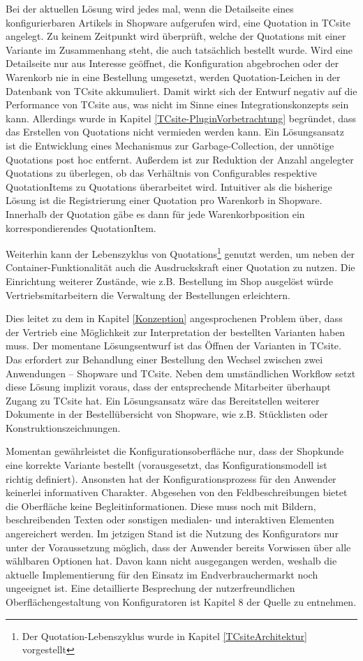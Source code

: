 \documentclass[11pt, a4paper, titlepage, listof=totoc, bibliography=totoc, index=totoc, twoside, openright, headings=normal]{scrreprt}
\begin{document}
Bei der aktuellen Lösung wird jedes mal, wenn die Detailseite eines konfigurierbaren Artikels in Shopware aufgerufen wird, eine Quotation in TCsite angelegt. Zu keinem Zeitpunkt wird überprüft, welche der Quotations mit einer Variante im Zusammenhang steht, die auch tatsächlich bestellt wurde. Wird eine Detailseite nur aus Interesse geöffnet, die Konfiguration abgebrochen oder der Warenkorb nie in eine Bestellung umgesetzt, werden \glqq Quotation-Leichen\grqq{} in der Datenbank von TCsite akkumuliert. Damit wirkt sich der Entwurf negativ auf die Performance von TCsite aus, was nicht im Sinne eines Integrationskonzepts sein kann. Allerdings wurde in Kapitel \ref{TCsite-PluginVorbetrachtung} begründet, dass das Erstellen von Quotations nicht vermieden werden kann. Ein Lösungsansatz ist die Entwicklung eines Mechanismus zur Garbage-Collection, der unnötige Quotations post hoc entfernt. Außerdem ist zur Reduktion der Anzahl angelegter Quotations zu überlegen, ob das Verhältnis von Configurables respektive QuotationItems zu Quotations überarbeitet wird. Intuitiver als die bisherige Lösung ist die Registrierung einer Quotation pro Warenkorb in Shopware. Innerhalb der Quotation gäbe es dann für jede Warenkorbposition ein korrespondierendes QuotationItem.

Weiterhin kann der Lebenszyklus von Quotations\footnote{Der Quotation-Lebenszyklus wurde in Kapitel \ref{TCsiteArchitektur} vorgestellt} genutzt werden, um neben der Container-Funktionalität auch die Ausdruckskraft einer Quotation zu nutzen. Die Einrichtung weiterer Zustände, wie z.B. \glqq Bestellung im Shop ausgelöst\grqq{} würde Vertriebsmitarbeitern die Verwaltung der Bestellungen erleichtern.

Dies leitet zu dem in Kapitel \ref{Konzeption} angesprochenen Problem über, dass der Vertrieb eine Möglichkeit zur Interpretation der bestellten Varianten haben muss. Der momentane Lösungsentwurf ist das Öffnen der Varianten in TCsite. Das erfordert zur Behandlung einer Bestellung den Wechsel zwischen zwei Anwendungen -- Shopware und TCsite. Neben dem umständlichen Workflow setzt diese Lösung implizit voraus, dass der entsprechende Mitarbeiter überhaupt Zugang zu TCsite hat. Ein Lösungsansatz wäre das Bereitstellen weiterer Dokumente in der Bestellübersicht von Shopware, wie z.B. Stücklisten oder Konstruktionszeichnungen.

Momentan gewährleistet die Konfigurationsoberfläche nur, dass der Shopkunde eine korrekte Variante bestellt (vorausgesetzt, das Konfigurationsmodell ist richtig definiert). Ansonsten hat der Konfigurationsprozess für den Anwender keinerlei informativen Charakter. Abgesehen von den Feldbeschreibungen bietet die Oberfläche keine Begleitinformationen. Diese muss noch mit Bildern, beschreibenden Texten oder sonstigen medialen- und interaktiven Elementen angereichert werden. Im jetzigen Stand ist die Nutzung des Konfigurators nur unter der Voraussetzung möglich, dass der Anwender bereits Vorwissen über alle wählbaren Optionen hat. Davon kann nicht ausgegangen werden, weshalb die aktuelle Implementierung für den Einsatz im Endverbrauchermarkt noch ungeeignet ist. Eine detaillierte Besprechung der nutzerfreundlichen Oberflächengestaltung von Konfiguratoren ist Kapitel 8 der Quelle \citet{felferning14} zu entnehmen.
\end{document}
